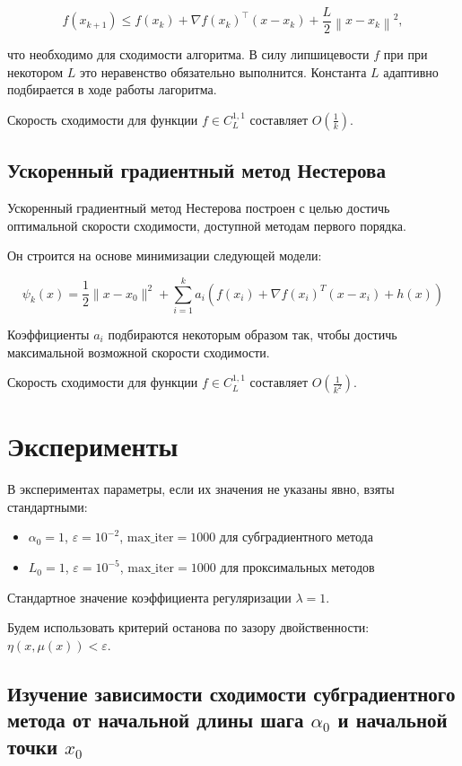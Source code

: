 \documentclass[11pt]{article}
\begin{document}
$$f(x_{k+1}) \le f\left(x_{k}\right)+\nabla f\left(x_{k}\right)^{\top}\left(x-x_{k}\right)+\frac{L}{2}\left\|x-x_{k}\right\|^{2},
$$

что необходимо для сходимости алгоритма. В силу липшицевости $f$ при при некотором $L$ это неравенство обязательно выполнится. Константа $L$ адаптивно подбирается в ходе работы лагоритма.

Скорость сходимости для функции $f \in C^{1, 1}_L$ составляет $O\left(\frac{1}{k}\right)$.

\subsection{Ускоренный градиентный метод Нестерова}

Ускоренный градиентный метод Нестерова построен с целью достичь оптимальной скорости сходимости, доступной методам первого порядка. 

Он строится на основе минимизации следующей модели:

$$
\psi_{k}(x)=\frac{1}{2} \| x-x_{0}\|^{2}+\sum_{i=1}^{k} a_{i}\left(f\left(x_{i}\right)+\nabla f\left(x_{i}\right)^{T}\left(x-x_{i}\right)+h(x)\right)
$$

Коэффициенты $a_i$ подбираются некоторым образом так, чтобы достичь максимальной возможной скорости сходимости.

Скорость сходимости для функции $f \in C^{1, 1}_L$ составляет $O\left(\frac{1}{k^2}\right)$.


\section{Эксперименты}

В экспериментах параметры, если их значения не указаны явно, взяты стандартными:

\begin{itemize}

\item $\alpha_0 = 1$, $\varepsilon = 10^{-2}$, $\text{max\_iter}=1000$ для субградиентного метода
\item $L_0=1$, $\varepsilon=10^{-5}$, $\text{max\_iter}=1000$ для проксимальных методов
\end{itemize}

Стандартное значение коэффициента регуляризации $\lambda=1$. 

Будем использовать критерий останова по зазору двойственности: $\eta(x, \mu(x)) < \varepsilon$.

\subsection{Изучение зависимости сходимости субградиентного метода от начальной длины шага $\alpha_0$ и начальной точки $x_0$}
\end{document}
